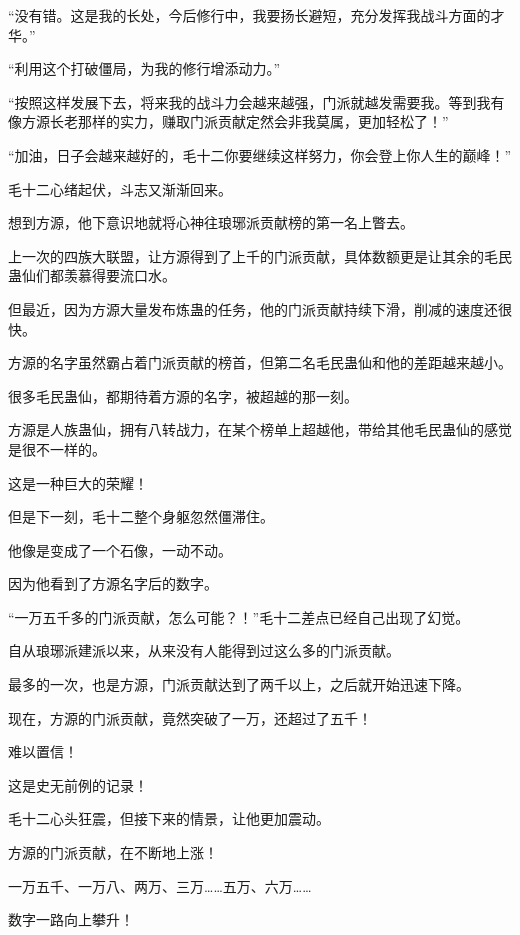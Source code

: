 
\begin{this_body}

“没有错。这是我的长处，今后修行中，我要扬长避短，充分发挥我战斗方面的才华。”

“利用这个打破僵局，为我的修行增添动力。”

“按照这样发展下去，将来我的战斗力会越来越强，门派就越发需要我。等到我有像方源长老那样的实力，赚取门派贡献定然会非我莫属，更加轻松了！”

“加油，日子会越来越好的，毛十二你要继续这样努力，你会登上你人生的巅峰！”

毛十二心绪起伏，斗志又渐渐回来。

想到方源，他下意识地就将心神往琅琊派贡献榜的第一名上瞥去。

上一次的四族大联盟，让方源得到了上千的门派贡献，具体数额更是让其余的毛民蛊仙们都羡慕得要流口水。

但最近，因为方源大量发布炼蛊的任务，他的门派贡献持续下滑，削减的速度还很快。

方源的名字虽然霸占着门派贡献的榜首，但第二名毛民蛊仙和他的差距越来越小。

很多毛民蛊仙，都期待着方源的名字，被超越的那一刻。

方源是人族蛊仙，拥有八转战力，在某个榜单上超越他，带给其他毛民蛊仙的感觉是很不一样的。

这是一种巨大的荣耀！

但是下一刻，毛十二整个身躯忽然僵滞住。

他像是变成了一个石像，一动不动。

因为他看到了方源名字后的数字。

“一万五千多的门派贡献，怎么可能？！”毛十二差点已经自己出现了幻觉。

自从琅琊派建派以来，从来没有人能得到过这么多的门派贡献。

最多的一次，也是方源，门派贡献达到了两千以上，之后就开始迅速下降。

现在，方源的门派贡献，竟然突破了一万，还超过了五千！

难以置信！

这是史无前例的记录！

毛十二心头狂震，但接下来的情景，让他更加震动。

方源的门派贡献，在不断地上涨！

一万五千、一万八、两万、三万……五万、六万……

数字一路向上攀升！


\end{this_body}
